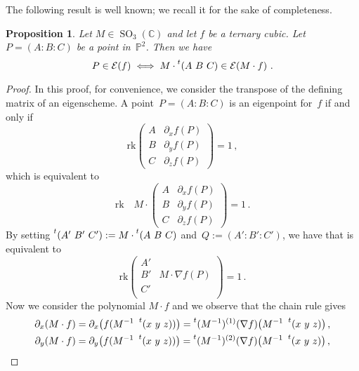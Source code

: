 \documentclass[a4paper, 11pt, reqno]{amsart}
\theoremstyle{plain}
\newtheorem{prop}[lemma]{Proposition}
\theoremstyle{definition}
\newcommand{\C}{\mathbb{C}}
\newcommand{\p}{\mathbb{P}}
\newcommand{\de}{\partial}
\newcommand{\rk}{\ensuremath{\mathrm{rk}}}
\newcommand{\SO}{\operatorname{SO}}
\newcommand{\Eig}[1]{\mathcal{E}\!\left( {#1} \right)}
\begin{document}
The following result is well known; we recall it for the sake of completeness.

\begin{prop}
Let $M \in \SO_3(\C)$ and let $f$ be a ternary cubic.
Let $P = (A: B: C)$ be a point in~$\p^2$.
Then we have
%
\[
  P \in \Eig{f} \iff M \cdot \prescript{t} {}(A \ B \ C) \in \Eig{M \cdot f} \,.
\]
%
\end{prop}
\begin{proof}
In this proof, for convenience,
we consider the transpose of the defining matrix of an eigenscheme.
A point~$P = (A: B: C)$ is an eigenpoint for~$f$ if and only if
%
\begin{equation*}
  \mathrm{rk}
  \begin{pmatrix}
    A & \de_x f(P) \\
    B & \de_y f(P) \\
    C & \de_z f(P)
  \end{pmatrix}
  = 1 \,,
\end{equation*}
%
which is equivalent to
%
\begin{equation}
\label{eq:def_matrix_M}
  \mathrm{rk} \quad M \cdot 
  \begin{pmatrix}
    A & \de_x f(P) \\
    B & \de_y f(P) \\
    C & \de_z f(P)
  \end{pmatrix}
  = 1 \,.
\end{equation}
%
By setting $\prescript{t} {}(A' \ B' \ C' ) := M \cdot \prescript{t} {}(A \ B \ C) $ and~$Q := (A':B':C')$, we have that 
is equivalent to
%
\begin{equation}
\label{eq:transformed}
  \rk
  \begin{pmatrix}
    A' & \\
    B' & M \cdot \nabla f (P) \\
    C' & \\
  \end{pmatrix}
  = 1 \,.
\end{equation}
%
Now we consider the polynomial $M \cdot f$ and we observe that the chain rule gives
%
\begin{gather*}
  \partial_x (M\cdot f) = \partial_x \bigl( f(M^{-1} \ \prescript{t} {} (x \ y \ z)) \bigr) = \prescript{t} {}(M^{-1})^{(1)}(\nabla f) \bigl( M^{-1}\ \prescript{t} {} (x \ y \ z) \bigr) \,, \\
  \partial_y (M\cdot f) = \partial_y \bigl( f(M^{-1} \ \prescript{t} {} (x \ y \ z)) \bigr) = \prescript{t} {}(M^{-1})^{(2)}(\nabla f) \bigl( M^{-1}\ \prescript{t} {} (x \ y \ z) \bigr) \,, \\

\end{gather*}
\end{proof}
\end{document}
